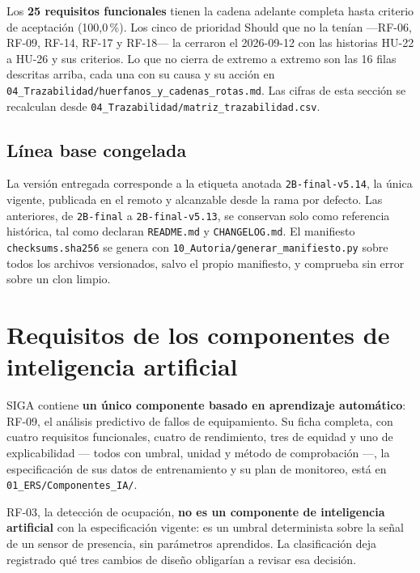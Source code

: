 \documentclass[11pt,a4paper]{article}
\begin{document}
Los \textbf{25 requisitos funcionales} tienen la cadena adelante completa hasta criterio
de aceptaci\'on (100,0\,\%). Los cinco de prioridad Should que no la ten\'ian ---RF-06, RF-09,
RF-14, RF-17 y RF-18--- la cerraron el 2026-09-12 con las historias HU-22 a HU-26 y sus
criterios. Lo que no cierra de extremo a extremo son las 16 filas descritas arriba, cada
una con su causa y su acci\'on en \texttt{04\_Trazabilidad/huerfanos\_y\_cadenas\_rotas.md}.
Las cifras de esta secci\'on se recalculan desde \texttt{04\_Trazabilidad/matriz\_trazabilidad.csv}.

\subsection{L\'inea base congelada}

{\sloppy
La versi\'on entregada corresponde a la etiqueta anotada \texttt{2B-final-v5.14}, la
\'unica vigente, publicada en el remoto y alcanzable desde la rama por defecto. Las
anteriores, de \texttt{2B-final} a \texttt{2B-final-v5.13}, se conservan solo como referencia
hist\'orica, tal como declaran \texttt{README.md} y \texttt{CHANGELOG.md}. El manifiesto
\texttt{checksums.sha256} se genera con \nolinkurl{10_Autoria/generar_manifiesto.py} sobre todos
los archivos versionados, salvo el propio manifiesto, y comprueba sin error sobre un clon limpio.\par}

\section{Requisitos de los componentes de inteligencia artificial}

SIGA contiene \textbf{un \'unico componente basado en aprendizaje autom\'atico}: RF-09,
el an\'alisis predictivo de fallos de equipamiento. Su ficha completa, con cuatro
requisitos funcionales, cuatro de rendimiento, tres de equidad y uno de explicabilidad
--- todos con umbral, unidad y m\'etodo de comprobaci\'on ---, la especificaci\'on de sus
datos de entrenamiento y su plan de monitoreo, est\'a en
\texttt{01\_ERS/Componentes\_IA/}.

RF-03, la detecci\'on de ocupaci\'on, \textbf{no es un componente de inteligencia
artificial} con la especificaci\'on vigente: es un umbral determinista sobre la se\~nal
de un sensor de presencia, sin par\'ametros aprendidos. La clasificaci\'on deja
registrado qu\'e tres cambios de dise\~no obligar\'ian a revisar esa decisi\'on.
\end{document}
